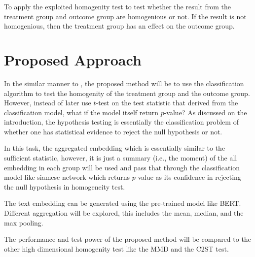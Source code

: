\documentclass{article}
\begin{document}
To apply the exploited homogenity test to test whether the result from the treatment group and outcome group
are homogenious or not. If the result is not homogenious, then the treatment group has an effect on the outcome group.



\section{Proposed Approach}
In the similar manner to \cite{c2st}, the proposed method will be to use the classification algorithm to test the homogenity of the treatment group and the outcome group.
However, instead of later use $t$-test on the test statistic that derived from the classification model, what if the model itself return $p$-value? As discussed on the introduction,
the hypothesis testing is essentially the classification problem of whether one has statistical evidence to reject the null hypothesis or not. 

In this task, the aggregated embedding which is essentially similar to the sufficient statistic, however, it is just a summary (i.e., the moment) of the all embedding in each group will be used and pass that through the classification model 
like siamese network\cite{siamese} which returns $p$-value as its confidence in rejecting the null hypothesis in homogeneity test.

The text embedding can be generated using the pre-trained model like BERT\cite{bert}. Different aggregation will be explored, this includes the mean, median, and the max pooling.

The performance and test power of the proposed method will be compared to the other high dimensional homogenity test like the MMD\cite{mmd} and the C2ST\cite{c2st} test.


\end{document}
